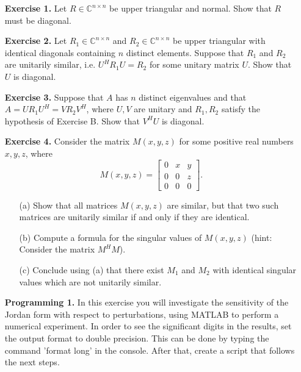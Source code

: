 \documentclass[14pt]{report}
\begin{document}
\begin{enumerate}
  \item[\textbf{Exercise 1.}] Let $R\in\mathbb{C}^{n\times n}$ be upper triangular and normal. Show that $R$ must be  diagonal. 


  \item[\textbf{Exercise 2.}] Let $R_1\in\mathbb{C}^{n\times n}$ and
    $R_2\in\mathbb{C}^{n\times n}$ be upper triangular with identical diagonals
    containing $n$ distinct elements. Suppose that $R_1$ and $R_2$ are 
    unitarily similar, i.e. $U^HR_1U = R_2$ for some unitary matrix $U$.
    Show that $U$ is diagonal.

  \item[\textbf{Exercise 3.}] Suppose that $A$ has $n$ distinct eigenvalues and
    that $A = U R_1 U^H = V R_2 V^H$, where $U,V$ are unitary and $R_1, R_2$ satisfy the hypothesis of Exercise B. Show that $V^H U$ is
    diagonal.


  \item[\textbf{Exercise 4.}] Consider the matrix $M(x,y,z)$ for some positive
    real numbers $x,y,z$, where
  \[M(x,y,z)=\left[\begin{array}{ccc}0&x&y\\0&0&z\\0&0&0\end{array}\right].\]
    \begin{enumerate}
      \item[(a)] Show that all matrices $M(x,y,z)$ are similar, but that two
         such matrices are unitarily similar if and only if they are identical.

      \item[(b)] Compute a formula for the singular values of $M(x,y,z)$ (hint: Consider the matrix $M^H M$).
      \item[(c)] Conclude using (a) that there exist $M_1$ and $M_2$ with
        identical singular values which are not unitarily similar.
      \end{enumerate}
  
  \item[\textbf{Programming 1.}] In this exercise you will investigate the
    sensitivity of the Jordan form with respect to perturbations, using MATLAB
    to perform a numerical experiment. In order to see the significant
    digits in the results, set the output format to double precision. This can
    be done by typing the command 'format long' in the console. After that,
    create a script that follows the next steps.


\end{enumerate}
\end{document}
